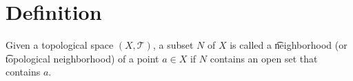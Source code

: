 
\section*{Definition}

Given a topological space $(X, \mathcal{T} )$, a subset $N$ of $X$ is called a \t{neighborhood} (or \t{topological neighborhood}) of a point $a \in X$ if $N$ contains an open set that contains $a$.

\blankpage